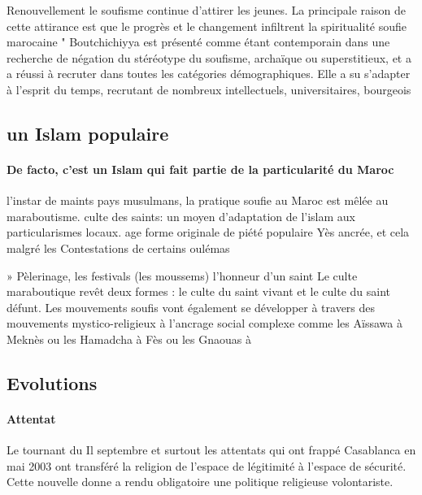 Renouvellement
  le soufisme continue d'attirer les jeunes. La principale raison de cette attirance est que le progrès et le changement infiltrent la spiritualité soufie marocaine " Boutchichiyya est présenté comme étant contemporain dans une recherche de négation du stéréotype du soufisme, archaïque ou superstitieux, et a a réussi à recruter dans toutes les catégories démographiques.
  Elle a su s'adapter à l'esprit du temps, recrutant de nombreux 
  intellectuels, universitaires, bourgeois


\subsection{un Islam populaire}



\paragraph{De facto, c'est un Islam qui fait partie de la particularité du Maroc}


l'instar de maints pays musulmans, la pratique soufie au Maroc est mêlée au maraboutisme.
  culte des saints: un moyen d'adaptation de l'islam aux particularismes locaux.
age forme originale de piété populaire
Yès ancrée, et cela malgré les
Contestations de certains oulémas

» Pèlerinage, les festivals (les moussems) l'honneur d'un saint   Le culte maraboutique revêt deux formes : le culte du saint vivant et le culte du saint défunt.
  Les mouvements soufis vont également se développer à travers des mouvements mystico-religieux à l'ancrage social complexe comme les Aïssawa à Meknès ou les Hamadcha à Fès ou les Gnaouas à

\subsection{Evolutions}

\paragraph{Attentat}
 Le tournant du Il septembre et surtout les attentats qui ont frappé Casablanca en mai 2003 ont transféré la religion de l'espace de légitimité à l'espace de sécurité.
  Cette nouvelle donne a rendu obligatoire une politique religieuse volontariste.
 
